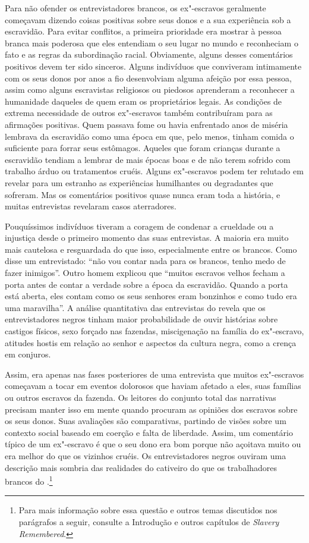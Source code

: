 Para não ofender os entrevistadores brancos, os ex"-escravos geralmente
começavam dizendo coisas positivas sobre seus donos e a sua experiência
sob a escravidão. Para evitar conflitos, a primeira prioridade era
mostrar à pessoa branca mais poderosa que eles entendiam o seu lugar no
mundo e reconheciam o fato e as regras da subordinação racial.
Obviamente, alguns desses comentários positivos devem ter sido sinceros.
Alguns indivíduos que conviveram intimamente com os seus donos por anos
a fio desenvolviam alguma afeição por essa pessoa, assim como alguns
escravistas religiosos ou piedosos aprenderam a reconhecer a humanidade
daqueles de quem eram os proprietários legais. As condições de extrema
necessidade de outros ex"-escravos também contribuíram para as afirmações
positivas. Quem passava fome ou havia enfrentado anos de miséria
lembrava da escravidão como uma época em que, pelo menos, tinham comida
o suficiente para forrar seus estômagos. Aqueles que foram crianças
durante a escravidão tendiam a lembrar de mais épocas boas e de não
terem sofrido com trabalho árduo ou tratamentos cruéis. Alguns
ex"-escravos podem ter relutado em revelar para um estranho as
experiências humilhantes ou degradantes que sofreram. Mas os comentários
positivos quase nunca eram toda a história, e muitas entrevistas
revelaram casos aterradores.

Pouquíssimos indivíduos tiveram a coragem de condenar a crueldade ou a
injustiça desde o primeiro momento das suas entrevistas. A maioria era
muito mais cautelosa e resguardada do que isso, especialmente entre os
brancos. Como disse um entrevistado: ``não vou contar nada para os
brancos, tenho medo de fazer inimigos''. Outro homem explicou que
``muitos escravos velhos fecham a porta antes de contar a verdade sobre
a época da escravidão. Quando a porta está aberta, eles contam como os
seus senhores eram bonzinhos e como tudo era uma maravilha''. A análise
quantitativa das entrevistas do  revela que os entrevistadores negros
tinham maior probabilidade de ouvir histórias sobre castigos físicos,
sexo forçado nas fazendas, miscigenação na família do ex"-escravo,
atitudes hostis em relação ao senhor e aspectos da cultura negra, como a
crença em conjuros.

Assim, era apenas nas fases posteriores de uma entrevista que muitos
ex"-escravos começavam a tocar em eventos dolorosos que haviam afetado a
eles, suas famílias ou outros escravos da fazenda. Os leitores do
conjunto total das narrativas precisam manter isso em mente quando
procuram as opiniões dos escravos sobre os seus donos. Suas avaliações
são comparativas, partindo de visões sobre um contexto social baseado em
coerção e falta de liberdade. Assim, um comentário típico de um
ex"-escravo é que o seu dono era bom porque não açoitava muito ou era
melhor do que os vizinhos cruéis. Os entrevistadores negros ouviram uma
descrição mais sombria das realidades do cativeiro do que os
trabalhadores brancos do .\footnote{Para mais informação sobre essa
  questão e outros temas discutidos nos parágrafos a seguir, consulte a
  Introdução e outros capítulos de \emph{Slavery Remembered}.}

